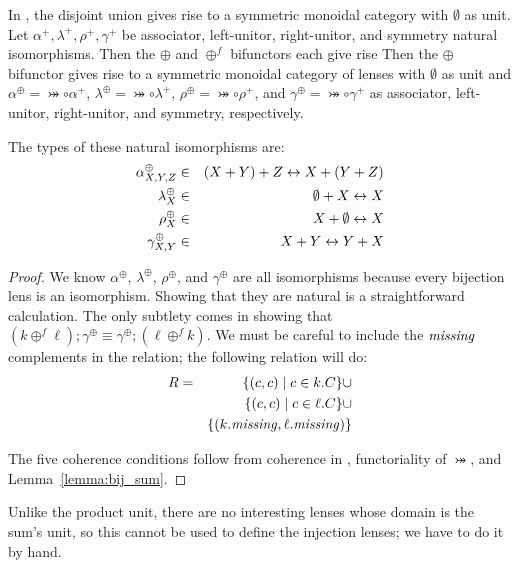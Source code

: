 \begin{defn}[$R$-similarity]
\begin{theorem}
\begin{lemma}
\begin{theorem}[No products]
\begin{lemma}
\begin{prop} 
In \SET, the disjoint union gives rise to a symmetric monoidal category with
$\emptyset$ as unit. Let $\alpha^+,\lambda^+,\rho^+,\gamma^+$ be associator,
left-unitor, right-unitor, and symmetry natural isomorphisms.
%
\iffull
Then the $\oplus$ and $\oplus^f$ bifunctors each give rise
\else
Then the $\oplus$ bifunctor gives rise
\fi
%
to a symmetric monoidal category of lenses with $\emptyset$ as unit and
$\alpha^\oplus=\bij\circ\alpha^+$, $\lambda^\oplus=\bij\circ\lambda^+$,
$\rho^\oplus=\bij\circ\rho^+$, and $\gamma^\oplus=\bij\circ\gamma^+$ as
associator, left-unitor, right-unitor, and symmetry, respectively.

The types of these natural isomorphisms are:
\begin{eqnarray*}
    \alpha^\oplus_{X,Y,Z}  &\in& (X + Y) + Z \leftrightarrow X + (Y + Z) \\
    \lambda^\oplus_X       &\in& \emptyset + X \leftrightarrow X \\
    \rho^\oplus_X          &\in& X + \emptyset \leftrightarrow X \\
    \gamma^\oplus_{X,Y}    &\in& X + Y \leftrightarrow Y + X
\end{eqnarray*}

\end{prop}

\iffull
\begin{proof}
We know $\alpha^\oplus$, $\lambda^\oplus$, $\rho^\oplus$, and
$\gamma^\oplus$ are all isomorphisms because every bijection lens is an
isomorphism. Showing that they are natural is a straightforward calculation.
The only subtlety comes in showing that $(k\oplus^f\ell);\gamma^\oplus \equiv
\gamma^\oplus;(\ell\oplus^fk)$. We must be careful to include the $\mathit{missing}$
complements in the relation; the following relation will do:
\begin{eqnarray*}
    R &=& \{( c, c) \mid c \in k.C\}\cup \\
      & & \{( c, c) \mid c \in \ell.C\}\cup \\
      & & \{( k.\mathit{missing}, \ell.\mathit{missing})\}
\end{eqnarray*}

The five coherence conditions follow from coherence in \SET, functoriality of
$\bij$, and Lemma~\ref{lemma:bij_sum}.
\end{proof}
\fi

Unlike the product unit, there are no interesting lenses whose domain is the sum's
unit, so this cannot be used to define the injection lenses; we have to do
it by hand.


\end{lemma}
\end{theorem}
\end{lemma}
\end{theorem}
\end{defn}
